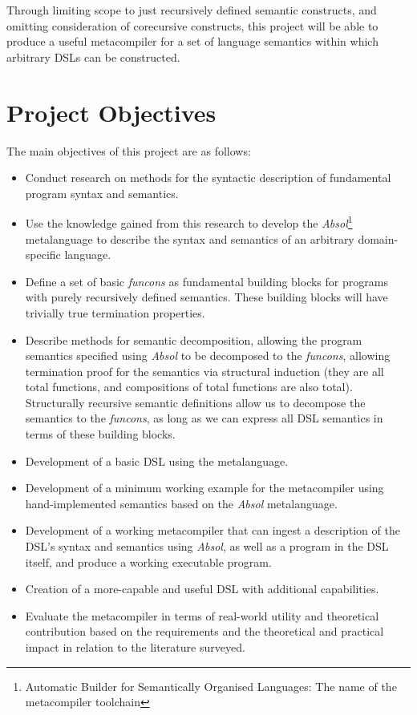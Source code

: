 Through limiting scope to just recursively defined semantic constructs, and omitting consideration of corecursive constructs, this project will be able to produce a useful metacompiler for a set of language semantics within which arbitrary DSLs can be constructed. 


\section{Project Objectives} %
\label{sec:project_objectives}
The main objectives of this project are as follows:
\begin{itemize}
    \item Conduct research on methods for the syntactic description of fundamental program syntax and semantics.
    \item Use the knowledge gained from this research to develop the \textit{Absol}\footnote{Automatic Builder for Semantically Organised Languages: The name of the metacompiler toolchain} metalanguage to describe the syntax and semantics of an arbitrary domain-specific language.
    \item Define a set of basic \textit{funcons} as fundamental building blocks for programs with purely recursively defined semantics. 
    These building blocks will have trivially true termination properties.
    \item Describe methods for semantic decomposition, allowing the program semantics specified using \textit{Absol} to be decomposed to the \textit{funcons}, allowing termination proof for the semantics via structural induction (they are all total functions, and compositions of total functions are also total).
    Structurally recursive semantic definitions allow us to decompose the semantics to the \textit{funcons}, as long as we can express all DSL semantics in terms of these building blocks. 
    \item Development of a basic DSL using the metalanguage.
    \item Development of a minimum working example for the metacompiler using hand-implemented semantics based on the \textit{Absol} metalanguage.
    \item Development of a working metacompiler that can ingest a description of the DSL's syntax and semantics using \textit{Absol}, as well as a program in the DSL itself, and produce a working executable program.
    \item Creation of a more-capable and useful DSL with additional capabilities.
    \item Evaluate the metacompiler in terms of real-world utility and theoretical contribution based on the requirements and the theoretical and practical impact in relation to the literature surveyed.
\end{itemize}



